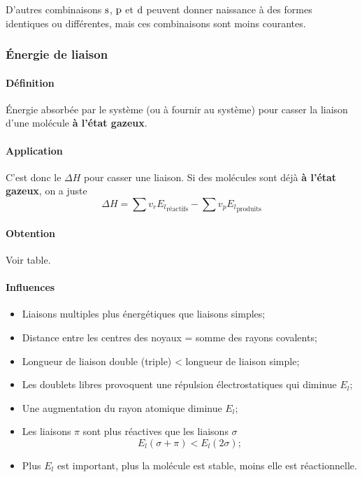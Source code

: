 D'autres combinaisons $\mathrm{s}$,
$\mathrm{p}$ et $\mathrm{d}$ peuvent donner naissance à des formes identiques ou différentes,
mais ces combinaisons sont moins courantes.

\subsubsection{\'Energie de liaison}
\label{sec:E_l}

\paragraph{Définition}
\'Energie absorbée par le système (ou à fournir au système) pour casser la liaison d'une molécule \textbf{à l'état gazeux}.

\paragraph{Application}
C'est donc le $\Delta H$ pour casser une liaison.
Si des molécules sont déjà \textbf{à l'état gazeux},
on a juste
\[ \Delta H = \sum v_r{E_l}_\mathrm{réactifs} - \sum v_p{E_l}_\mathrm{produits} \]

\paragraph{Obtention}
Voir table.

\paragraph{Influences}
\begin{itemize}
  \item Liaisons multiples plus énergétiques que liaisons simples;
  \item Distance entre les centres des noyaux = somme des rayons covalents;
  \item Longueur de liaison double (triple) < longueur de liaison simple;
  \item Les doublets libres provoquent une répulsion électrostatiques qui diminue $E_l$;
  \item Une augmentation du rayon atomique diminue $E_l$;
  \item Les liaisons $\pi$ sont plus réactives que les liaisons $\sigma$
    \[ E_l(\sigma + \pi) <  E_l(2\sigma) ; \]
  \item Plus $E_l$ est important,
    plus la molécule est stable,
    moins elle est réactionnelle.
\end{itemize}

